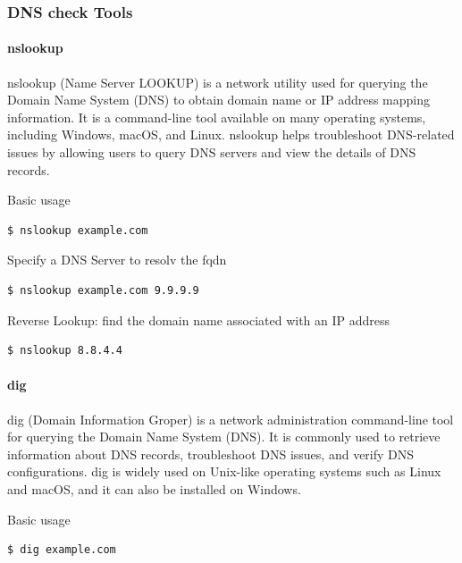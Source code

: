 \documentclass{article}
\newenvironment{codetemplate}[1][]{%
  \mybasecolorbox[#1]
  \itshape
}{%
  \endmybasecolorbox
}
\begin{document}
\subsubsection{DNS check Tools}

\paragraph{nslookup}

nslookup (Name Server LOOKUP) is a network utility used for querying the Domain Name System (DNS) to obtain domain name or IP address mapping information. It is a command-line tool available on many operating systems, including Windows, macOS, and Linux. nslookup helps troubleshoot DNS-related issues by allowing users to query DNS servers and view the details of DNS records.

Basic usage
\begin{codetemplate}{}
\begin{verbatim}
$ nslookup example.com
\end{verbatim}
\end{codetemplate}

Specify a DNS Server to resolv the fqdn
\begin{codetemplate}{}
\begin{verbatim}
$ nslookup example.com 9.9.9.9
\end{verbatim}
\end{codetemplate}

Reverse Lookup: find the domain name associated with an IP address
\begin{codetemplate}{}
\begin{verbatim}
$ nslookup 8.8.4.4
\end{verbatim}
\end{codetemplate}

\paragraph{dig}

dig (Domain Information Groper) is a network administration command-line tool for querying the Domain Name System (DNS). It is commonly used to retrieve information about DNS records, troubleshoot DNS issues, and verify DNS configurations. dig is widely used on Unix-like operating systems such as Linux and macOS, and it can also be installed on Windows.

Basic usage
\begin{codetemplate}{}
\begin{verbatim}
$ dig example.com
\end{verbatim}
\end{codetemplate}
\end{document}
